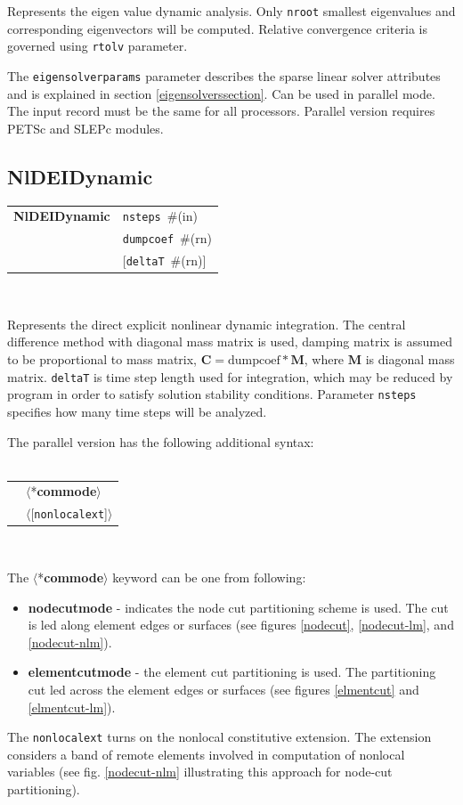 \documentclass[a4paper]{article}
\makeatletter
\newcommand{\mbf}[1]{\boldsymbol{#1}}
\newcommand{\param}[1]{\texttt{#1}} %
\newcommand{\optional}[1]{[#1]} %
\newcommand{\field}[2]{\param{#1}~\#{\tiny(#2)}} %
\newcommand{\optField}[2]{\optional{\field{#1}{#2}}}
\newcommand{\optFieldnotype}[1]{[\param{#1}]}
\newcommand{\entKeyword}[1]{*\textbf{#1}} %
\newcommand{\entKeywordInst}[1]{\textbf{#1}} %
\newcommand{\Pmode}[1]{{\sffamily #1}}
\renewcommand{\parallel}[1]{$\langle${#1}$\rangle$}
\newcommand{\PentKeyword    }[1]{\parallel{\entKeyword{#1}}}
\newcommand{\PoptFieldnotype}[1]{\parallel{\optFieldnotype{#1}}}
\newenvironment{record}[1][]{\begin{tabular}{|ll}}{\end{tabular}\\}
\newcommand{\recentry}[2]{{#1}&{#2}\\}
\newcounter{rcc}
\newenvironment{record}[1][\textwidth]{\setcounter{rcc}{0}\begin{tabular*}{#1}{|ll@{\extracolsep{\fill}}r}}{\end{tabular*}\\}
\newcommand{\recentry}[2]{\ifthenelse{\value{rcc}>0}{&$\backslash$ \\}{\setcounter{rcc}{1}}{#1}&{#2}}
\makeatother
\begin{document}
Represents the eigen value dynamic analysis.
Only \param{nroot} smallest eigenvalues and corresponding
eigenvectors will be computed. Relative convergence criteria is
governed using \param{rtolv} parameter.

The \param{eigensolverparams} parameter describes the sparse
linear solver attributes and is explained in section \ref{eigensolverssection}.
\Pmode{Can be used in parallel mode. The input record must be the same
for all processors. Parallel version requires PETSc and SLEPc modules.}


\subsection{NlDEIDynamic}
\label{NlDEIDynamic}
\begin{record}
  \recentry{\entKeywordInst{NlDEIDynamic}}{\field{nsteps}{in}}
  \recentry{}{\field{dumpcoef}{rn}}
  \recentry{}{\optField{deltaT}{rn}}
\end{record}

Represents the direct explicit  nonlinear dynamic  integration.
The central difference method with diagonal mass matrix is used,
damping matrix is assumed to be proportional to mass matrix, $\mbf{C}
= \mathrm{dumpcoef} * \mbf{M}$, where
$\mbf{M}$ is diagonal mass matrix. \param{deltaT} is time step length used for
integration, which may be reduced by program in order to satisfy
solution stability conditions. Parameter \param{nsteps} specifies
how many time steps will be analyzed.

The parallel version has the following additional syntax:\\ \\
\begin{record}
  \recentry{}{\PentKeyword{commode}}
  \recentry{}{\PoptFieldnotype{nonlocalext}}
\end{record}

\noindent
\Pmode{
The \PentKeyword{commode} keyword can be one from following:
\begin{itemize}
\item \entKeywordInst{nodecutmode} - indicates the node cut partitioning scheme is
used. The cut is led along element edges or surfaces (see
figures \ref{nodecut}, \ref{nodecut-lm}, and \ref{nodecut-nlm}).
\item \entKeywordInst{elementcutmode} - the element cut partitioning is used. The
partitioning cut led across the element edges or surfaces (see
figures \ref{elmentcut} and \ref{elmentcut-lm}).
\end{itemize}
\Pmode{
The \param{nonlocalext} turns on the nonlocal constitutive
extension. The extension considers a band of remote elements involved
in computation of nonlocal variables (see fig. \ref{nodecut-nlm} illustrating
this approach for node-cut partitioning).
}
}
\end{document}
